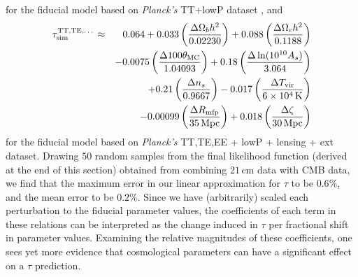 \documentclass[twocolumn,aps,prd,nofootinbib,showpacs,superscriptaddress]{revtex4-1}
\begin{document}
for the fiducial model based on \emph{Planck's} TT+lowP dataset , and
\begin{eqnarray}
\label{eq:TTTEEE_linearTau}
\tau_\textrm{sim}^\textrm{TT,TE,\dots} \approx &&\, 0.064 + 0.033  \left(\frac{\Delta\Omega_b h^2}{0.02230}\right) + 0.088\left(\frac{\Delta\Omega_c h^2}{0.1188}\right) \nonumber\\ 
&&  -0.0075 \left(\frac{\Delta100\theta_\textrm{MC}}{1.04093}\right) +   0.18\left(\frac{\Delta\ln (10^{10} A_s)}{3.064}\right)\nonumber \\
&& +   0.21 \left(\frac{\Delta n_s}{0.9667}\right)  -0.017 \left(\frac{\Delta T_\textrm{vir}}{6 \times 10^4\,\textrm{K}}\right)\nonumber \\
&& -0.00099 \left(\frac{\Delta R_\textrm{mfp}}{35\,\textrm{Mpc}}\right) +  0.018 \left(\frac{\Delta \zeta}{30\,\textrm{Mpc}}\right)
\end{eqnarray}
for the fiducial model based on \emph{Planck's} TT,TE,EE + lowP + lensing + ext dataset. Drawing $50$ random samples from the final likelihood function (derived at the end of this section) obtained from combining $21\,\textrm{cm}$ data with CMB data, we find that the maximum error in our linear approximation for $\tau$ to be $0.6\%$, and the mean error to be $0.2\%$. Since we have (arbitrarily) scaled each perturbation to the fiducial parameter values, the coefficients of each term in these relations can be interpreted as the change induced in $\tau$ per fractional shift in parameter values. Examining the relative magnitudes of these coefficients, one sees yet more evidence that cosmological parameters can have a significant effect on a $\tau$ prediction.
\end{document}
